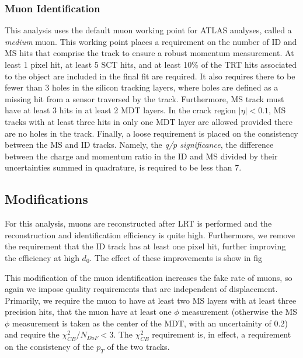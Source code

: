 
\subsubsection{Muon Identification}

This analysis uses the default muon working point for ATLAS analyses, called a \emph{medium} muon. This working point places a requirement on the number of \ac{ID} and \ac{MS} hits that comprise the track to ensure a robust momentum measurement. At least 1 pixel hit, at least 5 \ac{SCT} hits, and at least 10\% of the \ac{TRT} hits associated to the object are included in the final fit are required. It also requires there to be fewer than 3 holes in the silicon tracking layers, where holes are defined as a missing hit from a sensor traversed by the track. Furthermore, \ac{MS} track must have at least 3 hits in at least 2 \ac{MDT} layers. In the crack region $|\eta| < 0.1$, \ac{MS} tracks with at least three hits in only one \ac{MDT} layer are allowed provided there are no holes in the track. Finally, a loose requirement is placed on the consistency between the \ac{MS} and \ac{ID} tracks. Namely, the \emph{q/p significance}, the difference between the charge and momentum ratio in the \ac{ID} and \ac{MS} divided by their uncertainties summed in quadrature, is required to be less than 7. 



\subsection{Modifications}

For this analysis, muons are reconstructed after \ac{LRT} is performed and the reconstruction and identification efficiency is quite high. Furthermore, we remove the requirement that the \ac{ID} track has at least one pixel hit, further improving the efficiency at high $d_{0}$. The effect of these improvements is show in fig %


This modification of the muon identification increases the fake rate of muons, so again we impose quality requirements that are independent of displacement. Primarily, we require the muon to have at least two \ac{MS} layers with at least three precision hits, that the muon have at least one $\phi$ measurement (otherwise the \ac{MS} $\phi$ measurement is taken as the center of the \ac{MDT}, with an uncertainity of 0.2) and require the $\chi^{2}_{CB}/N_{DoF} < 3$. The $\chi^{2}_{CB}$ requirement is, in effect, a requirement on the consistency of the $p_{T}$ of the two tracks. 



